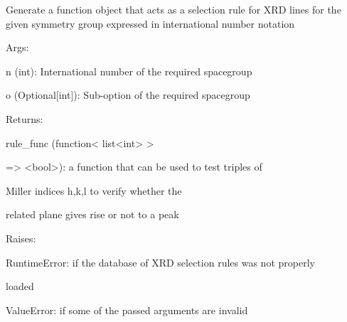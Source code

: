 \documentclass[letterpaper,10pt,english]{sphinxmanual}
\begin{document}

\begin{fulllineitems}
\label{doctree/soprano.calculate.xrd.sel_rules:soprano.calculate.xrd.sel_rules.get_sel_rule_from_international}
Generate a function object that acts as a selection rule for XRD lines
for the given symmetry group expressed in international number notation

\begin{DUlineblock}{0em}
\item[] Args:
\item[]
\begin{DUlineblock}{\DUlineblockindent}
\item[] n (int): International number of the required spacegroup
\item[] o (Optional{[}int{]}): Sub-option of the required spacegroup
\end{DUlineblock}
\end{DUlineblock}

\begin{DUlineblock}{0em}
\item[] Returns:
\item[]
\begin{DUlineblock}{\DUlineblockindent}
\item[] rule\_func (function\textless{} list\textless{}int\textgreater{} \textgreater{}
\item[]
\begin{DUlineblock}{\DUlineblockindent}
\item[] =\textgreater{} \textless{}bool\textgreater{}): a function that can be used to test triples of
\item[]
\begin{DUlineblock}{\DUlineblockindent}
\item[] Miller indices h,k,l to verify whether the
\item[] related plane gives rise or not to a peak
\end{DUlineblock}
\end{DUlineblock}
\end{DUlineblock}
\end{DUlineblock}

\begin{DUlineblock}{0em}
\item[] Raises:
\item[]
\begin{DUlineblock}{\DUlineblockindent}
\item[] RuntimeError: if the database of XRD selection rules was not properly
\item[]
\begin{DUlineblock}{\DUlineblockindent}
\item[] loaded
\end{DUlineblock}
\item[] ValueError: if some of the passed arguments are invalid
\end{DUlineblock}
\end{DUlineblock}


\end{fulllineitems}
\end{document}
